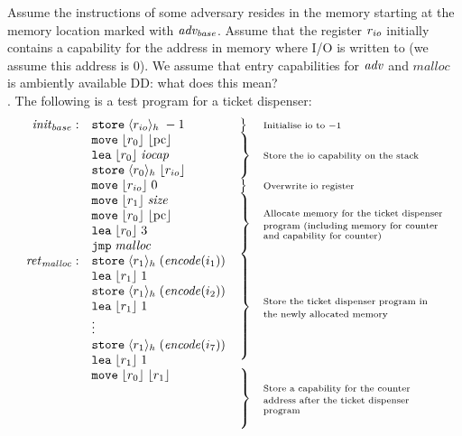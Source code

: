 \documentclass[a4paper]{article}
\newcommand\dominique[1]{{\color{purple} \sf \footnotesize {DD: #1}}\\}
\newcommand{\pcreg}{\mathrm{pc}}
\newcommand{\plainfun}[2]{
  \ifthenelse{\equal{#2}{}}
             {\mathit{#1}}
             {\mathit{#1}(#2)}
}
\newcommand{\encode}{\plainfun{encode}{}}
\newcommand{\codelabel}[1]{\mathit{#1}}
\newcommand{\malloc}{\codelabel{malloc}}
\newcommand{\iocap}{\codelabel{iocap}}
\newcommand{\refreg}[1]{\lfloor #1 \rfloor}
\newcommand{\refheap}[1]{\langle #1 \rangle_h}
\newcommand{\zinstr}[1]{\mathtt{#1}}
\newcommand{\oneinstr}[2]{\zinstr{#1} \; #2}
\newcommand{\jmp}[1]{\oneinstr{jmp}{#1}}
\newcommand{\twoinstr}[3]{\zinstr{#1} \; #2 \; #3}
\newcommand{\move}[2]{\twoinstr{move}{#1}{#2}}
\newcommand{\store}[2]{\twoinstr{store}{#1}{#2}}
\newcommand{\lea}[2]{\twoinstr{lea}{#1}{#2}}
\begin{document}
Assume the instructions of some adversary resides in the memory starting at the memory location marked with $\mathit{adv_{base}}$. Assume that the register $r_{io}$ initially contains a capability for the address in memory where I/O is written to (we assume this address is 0). We assume that entry capabilities for $\adv$ and $\malloc$ is ambiently available\dominique{what does this mean?}. The following is a test program for a ticket dispenser:
\[
  \begin{array}{r l l p{\mrlen}}
\initb:     & \store{\refheap{\rio}}{-1} & \bracket{1} & \annotate{1}{Initialise io to $-1$} \\
           & \move{\refreg{r_0}}{\refreg{\pcreg}} & \bracket{3} & \annotate{3}{Store the io capability on the stack} \\
           & \lea{\refreg{r_0}}{\iocap} & & \\
           & \store{\refheap{r_0}}{\refreg{\rio}} & & \\
           & \move{\refreg{\rio}}{0} & \bracket{1} & \annotate{1}{Overwrite io register} \\
           & \move{\refreg{r_1}}{\size} &  \bracket{4} & \annotate{4}{Allocate memory for the ticket dispenser program (including memory for counter and capability for counter)}\\
           & \move{\refreg{r_0}}{\refreg{\pcreg}} & & \\
           & \lea{\refreg{r_0}}{3} & & \\
           & \jmp{\malloc} & & \\
\retm:     & \store{\refheap{r_1}}{(\encode(i_1))} & \bracket{7} & \annotate{7}{Store the ticket dispenser program in the newly allocated memory} \\
           & \lea{\refreg{r_1}}{1} & & \\
           & \store{\refheap{r_1}}{(\encode(i_2))} & & \\
           & \lea{\refreg{r_1}}{1} & & \\
           & \vdots & & \\
           & \store{\refheap{r_1}}{(\encode(i_7))} & & \\
           & \lea{\refreg{r_1}}{1} & & \\
           & \move{\refreg{r_0}}{\refreg{r_1}} & \bracket{4} & \annotate{4}{Store a capability for the counter address after the ticket dispenser program} \\

\end{array}\]
\end{document}

